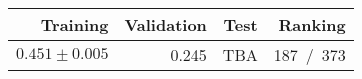 \begin{tabular}{r|r|r|r}
Training          & Validation & Test & Ranking   \\ \hline
$0.451 \pm 0.005$ & 0.245      & TBA  & 187~/~373 \\ \hline
\end{tabular}